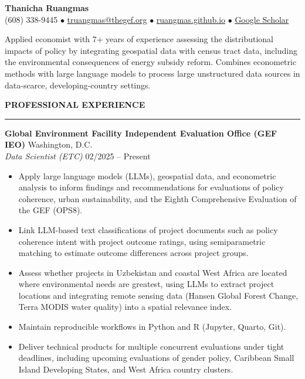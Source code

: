 \documentclass[11pt,letterpaper]{article}
\renewcommand{\section}[1]{%
  \par\vspace{10pt}%
  {\large\bfseries\color{accent}#1}\par\vspace{-3pt}%
  {\color{accent}\rule{\linewidth}{0.6pt}}\par\vspace{4pt}}
\newcommand{\entry}[4]{%
  \textbf{#1} \hfill #2 \\
  \textit{#3} \hfill #4 \par\vspace{1pt}}
\begin{document}
\begin{center}
  {\LARGE \textbf{Thanicha Ruangmas}} \\[4pt]
  (608) 338-9445 \enspace$\bullet$\enspace
  \href{mailto:truangmas@thegef.org}{truangmas@thegef.org} \enspace$\bullet$\enspace
  \href{https://ruangmas.github.io}{ruangmas.github.io} \enspace$\bullet$\enspace
  \href{https://scholar.google.com/citations?user=Z34dNFcAAAAJ&hl=en}{Google Scholar}
\end{center}

\vspace{10pt}
Applied economist with 7+ years of experience assessing the distributional impacts of policy by integrating geospatial data with census tract data, including the environmental consequences of energy subsidy reform. Combines econometric methods with large language models to process large unstructured data sources in data-scarce, developing-country settings.

\vspace{10pt}
\section{PROFESSIONAL EXPERIENCE}

\entry{Global Environment Facility Independent Evaluation Office (GEF IEO)}{Washington, D.C.}{Data Scientist (ETC)}{02/2025 -- Present}
\begin{itemize}
  \item Apply large language models (LLMs), geospatial data, and econometric analysis to inform findings and recommendations for evaluations of policy coherence, urban sustainability, and the Eighth Comprehensive Evaluation of the GEF (OPS8).
  \item Link LLM-based text classifications of project documents such as policy coherence intent with project outcome ratings, using semiparametric matching to estimate outcome differences across project groups.
  \item Assess whether projects in Uzbekistan and coastal West Africa are located where environmental needs are greatest, using LLMs to extract project locations and integrating remote sensing data (Hansen Global Forest Change, Terra MODIS water quality) into a spatial relevance index.
  \item Maintain reproducible workflows in Python and R (Jupyter, Quarto, Git).
  \item Deliver technical products for multiple concurrent evaluations under tight deadlines, including upcoming evaluations of gender policy, Caribbean Small Island Developing States, and West Africa country clusters.
\end{itemize}
\end{document}
